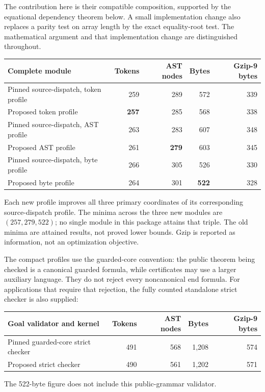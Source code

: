 \documentclass[11pt,letterpaper]{article}
\theoremstyle{definition}
\begin{document}
The contribution here is their compatible composition, supported by the
equational dependency theorem below. A small implementation change also
replaces a parity test on array length by the exact equality-root test.
The mathematical argument and that implementation change are distinguished
throughout.

\begin{center}
\begin{tabular}{lrrrr}
\toprule
Complete module & Tokens & AST nodes & Bytes & Gzip-9 bytes\\
\midrule
Pinned source-dispatch, token profile & 259 & 289 & 572 & 339\\
Proposed token profile & \textbf{257} & 285 & 568 & 338\\
Pinned source-dispatch, AST profile & 263 & 283 & 607 & 348\\
Proposed AST profile & 261 & \textbf{279} & 603 & 345\\
Pinned source-dispatch, byte profile & 266 & 305 & 526 & 330\\
Proposed byte profile & 264 & 301 & \textbf{522} & 328\\
\bottomrule
\end{tabular}
\end{center}

Each new profile improves all three primary coordinates of its corresponding
source-dispatch profile. The minima across the three new modules are
$(257,279,522)$; no single module in this package attains that triple.
The old minima are attained results, not proved lower bounds.
Gzip is reported as information, not an optimization objective.

The compact profiles use the guarded-core convention: the public theorem
being checked is a canonical guarded formula, while certificates may use a
larger auxiliary language. They do not reject every noncanonical end formula.
For applications that require that rejection, the fully counted standalone
strict checker is also supplied:
\begin{center}
\begin{tabular}{lrrrr}
\toprule
Goal validator and kernel & Tokens & AST nodes & Bytes & Gzip-9 bytes\\
\midrule
Pinned guarded-core strict checker & 491 & 568 & 1,208 & 574\\
Proposed strict checker & 490 & 561 & 1,202 & 571\\
\bottomrule
\end{tabular}
\end{center}
The 522-byte figure does not include this public-grammar validator.
\end{document}
